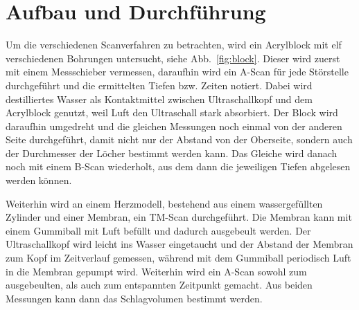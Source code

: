 \section {Aufbau und Durchführung}
\label{sec:durchführung}

Um die verschiedenen Scanverfahren zu betrachten, wird ein Acrylblock mit elf verschiedenen Bohrungen untersucht, siehe Abb.~\ref{fig:block}. Dieser wird zuerst mit einem Messschieber vermessen, daraufhin wird ein A-Scan für jede Störstelle durchgeführt und die ermittelten Tiefen bzw. Zeiten notiert. Dabei wird destilliertes Wasser als Kontaktmittel zwischen Ultraschallkopf und dem Acrylblock genutzt, weil Luft den Ultraschall stark absorbiert. Der Block wird daraufhin umgedreht und die gleichen Messungen noch einmal von der anderen Seite durchgeführt, damit nicht nur der Abstand von der Oberseite, sondern auch der Durchmesser der Löcher bestimmt werden kann. Das Gleiche wird danach noch mit einem B-Scan wiederholt, aus dem dann die jeweiligen Tiefen abgelesen werden können.

Weiterhin wird an einem Herzmodell, bestehend aus einem wassergefüllten Zylinder und einer Membran, ein TM-Scan durchgeführt. Die Membran kann mit einem Gummiball mit Luft befüllt und dadurch ausgebeult werden. Der Ultraschallkopf wird leicht ins Wasser eingetaucht und der Abstand der Membran zum Kopf im Zeitverlauf gemessen, während mit dem Gummiball periodisch Luft in die Membran gepumpt wird. Weiterhin wird ein A-Scan sowohl zum ausgebeulten, als auch zum entspannten Zeitpunkt gemacht. Aus beiden Messungen kann dann das Schlagvolumen bestimmt werden.
